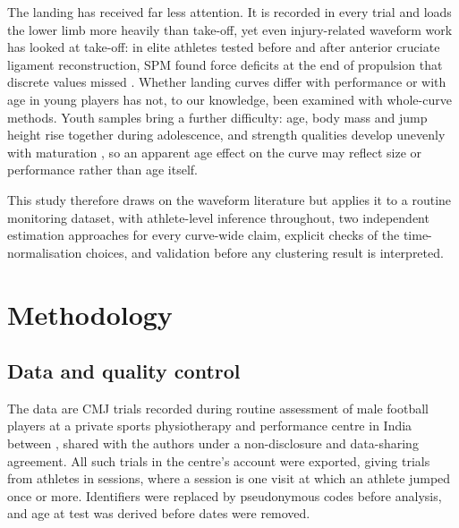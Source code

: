The landing has received far less attention. It is recorded in every trial and loads the lower limb more heavily than take-off, yet even injury-related waveform work has looked at take-off: in elite athletes tested before and after anterior cruciate ligament reconstruction, SPM found force deficits at the end of propulsion that discrete values missed \parencite{acl2025}. Whether landing curves differ with performance or with age in young players has not, to our knowledge, been examined with whole-curve methods. Youth samples bring a further difficulty: age, body mass and jump height rise together during adolescence, and strength qualities develop unevenly with maturation \parencite{lloyd2012,malina2015}, so an apparent age effect on the curve may reflect size or performance rather than age itself.

This study therefore draws on the waveform literature but applies it to a routine monitoring dataset, with athlete-level inference throughout, two independent estimation approaches for every curve-wide claim, explicit checks of the time-normalisation choices, and validation before any clustering result is interpreted.

\section{Methodology}
\label{sec:methods}

\subsection{Data and quality control}

The data are CMJ trials recorded during routine assessment of male football players at a private sports physiotherapy and performance centre in India between \testPeriod, shared with the authors under a non-disclosure and data-sharing agreement. All such trials in the centre's account were exported, giving \nTrialsAll{} trials from \nAthAll{} athletes in \nSessAll{} sessions, where a session is one visit at which an athlete jumped once or more. Identifiers were replaced by pseudonymous codes before analysis, and age at test was derived before dates were removed. 

